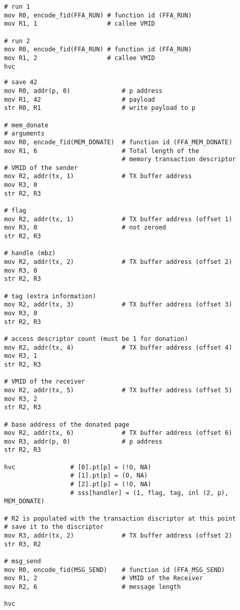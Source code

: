 \documentclass{article}
\begin{document}
\begin{lstlisting}[caption={VM 0}]
# run 1
mov R0, encode_fid(FFA_RUN) # function id (FFA_RUN)
mov R1, 1                   # callee VMID

# run 2
mov R0, encode_fid(FFA_RUN) # function id (FFA_RUN)
mov R1, 2                   # callee VMID
hvc
\end{lstlisting}

\begin{lstlisting}[caption={VM 1}]
# save 42
mov R0, addr(p, 0)              # p address
mov R1, 42                      # payload
str R0, R1                      # write payload to p

# mem_donate
# arguments
mov R0, encode_fid(MEM_DONATE)  # function id (FFA_MEM_DONATE)
mov R1, 6                       # Total length of the  
                                # memory transaction descriptor
# VMID of the sender 
mov R2, addr(tx, 1)             # TX buffer address                               
mov R3, 0
str R2, R3

# flag
mov R2, addr(tx, 1)             # TX buffer address (offset 1)                               
mov R3, 0                       # not zeroed
str R2, R3

# handle (mbz)
mov R2, addr(tx, 2)             # TX buffer address (offset 2)
mov R3, 0
str R2, R3

# tag (extra information)
mov R2, addr(tx, 3)             # TX buffer address (offset 3)
mov R3, 0
str R2, R3

# access descriptor count (must be 1 for donation)
mov R2, addr(tx, 4)             # TX buffer address (offset 4)
mov R3, 1
str R2, R3

# VMID of the receiver
mov R2, addr(tx, 5)             # TX buffer address (offset 5)
mov R3, 2
str R2, R3

# base address of the donated page
mov R2, addr(tx, 6)             # TX buffer address (offset 6)
mov R3, addr(p, 0)              # p address
str R2, R3

hvc               # [0].pt[p] = (!O, NA)
                  # [1].pt[p] = (O, NA)
                  # [2].pt[p] = (!O, NA)
                  # sss[handler] = (1, flag, tag, inl (2, p), MEM_DONATE)

# R2 is populated with the transaction discriptor at this point
# save it to the discriptor
mov R3, addr(tx, 2)             # TX buffer address (offset 2)
str R3, R2

# msg_send
mov R0, encode_fid(MSG_SEND)    # function id (FFA_MSG_SEND)
mov R1, 2                       # VMID of the Receiver
mov R2, 6                       # message length

hvc
\end{lstlisting}
\end{document}
